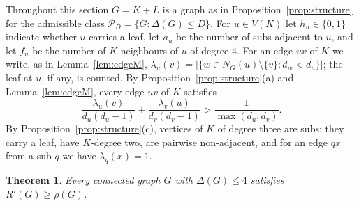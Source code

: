 \documentclass[11pt]{amsart}
\newtheorem{theorem}{Theorem}[section]
\theoremstyle{definition}
\newcommand{\Rp}{R'}
\begin{document}
Throughout this section $G=K+L$ is a graph as in Proposition~\ref{prop:structure} for the admissible class
$\mathcal P_D=\{G:\Delta(G)\le D\}$. For $u\in V(K)$ let $h_u\in\{0,1\}$ indicate whether $u$ carries a leaf, let
$a_u$ be the number of subs adjacent to $u$, and let $f_u$ be the number of $K$-neighbours of $u$ of degree $4$.
For an edge $uv$ of $K$ we write, as in Lemma~\ref{lem:edgeM},
$\lambda_u(v)=|\{w\in N_G(u)\setminus\{v\}:d_w<d_u\}|$; the leaf at $u$, if any, is counted. By
Proposition~\ref{prop:structure}(a) and Lemma~\ref{lem:edgeM}, every edge $uv$ of $K$ satisfies
\begin{equation}\label{eq:supp}
\frac{\lambda_u(v)}{d_u(d_u-1)}+\frac{\lambda_v(u)}{d_v(d_v-1)}>\frac1{\max(d_u,d_v)} .
\end{equation}
By Proposition~\ref{prop:structure}(c), vertices of $K$ of degree three are subs: they carry a leaf, have
$K$-degree two, are pairwise non-adjacent, and for an edge $qx$ from a sub $q$ we have $\lambda_q(x)=1$.

\begin{theorem}\label{thm:D4}
Every connected graph $G$ with $\Delta(G)\le4$ satisfies $\Rp(G)\ge\rho(G)$.
\end{theorem}
\end{document}
